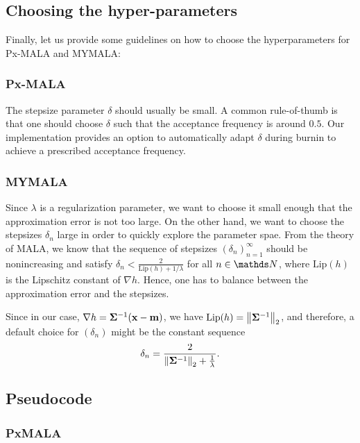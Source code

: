 \documentclass[10pt]{article}
\numberwithin{equation}{section}
\begin{document}
\subsection{Choosing the hyper-parameters}

Finally, let us provide some guidelines on how to choose the hyperparameters for Px-MALA and MYMALA:

\subsubsection*{Px-MALA}

The stepsize parameter $\delta$ should usually be small. A common rule-of-thumb is that one should choose $\delta$ such that the acceptance frequency is around $0.5$. Our implementation provides an option to automatically adapt $\delta$ during burnin to achieve a prescribed acceptance frequency.

\subsubsection*{MYMALA}

Since $\lambda$ is a regularization parameter, we want to choose it small enough that the approximation error is not too large. On the other hand, we want to choose the stepsizes $\delta_n$ large in order to quickly explore the parameter spae. From the theory of MALA, we know that the sequence of stepsizes $(\delta_n)_{n=1}^\infty$ should be nonincreasing and satisfy $\delta_n < \frac{2}{\mathrm{Lip}(h) + 1/\lambda}$ for all $n \in \N$, where $\mathrm{Lip}(h)$ is the Lipschitz constant of $\nabla h$. Hence, one has to balance between the approximation error and the stepsizes.

Since in our case, $\nabla h = \mathbf{\Sigma}^{-1}(\mathbf{x} - \mathbf{m})$, we have $\mathrm{Lip}(h) = \left\|\mathbf{\Sigma}^{-1}\right\|_2$, and therefore, a default choice for $(\delta_n)$ might be the constant sequence
\begin{align*}
\delta_n = \frac{2}{\left\|\mathbf{\Sigma}^{-1}\right\|_2 + \frac{1}{\lambda}}.
\end{align*}

\subsection{Pseudocode}

\subsubsection*{PxMALA}
\end{document}
